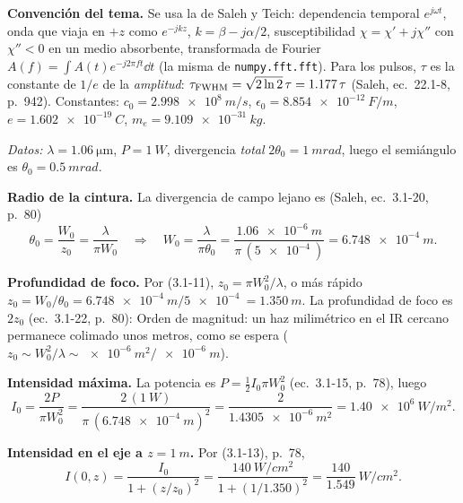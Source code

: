 
\textbf{Convención del tema.} Se usa la de Saleh y Teich: dependencia temporal $e^{j\omega t}$, onda que
viaja en $+z$ como $e^{-jkz}$, $k=\beta-j\alpha/2$, susceptibilidad $\chi=\chi'+j\chi''$ con
$\chi''<0$ en un medio absorbente, transformada de Fourier $A(f)=\int A(t)e^{-j2\pi ft}\dd t$
(la misma de \texttt{numpy.fft.fft}). Para los pulsos, $\tau$ es la constante de $1/e$ de la
\emph{amplitud}: $\tau_{\rm FWHM}=\sqrt{2\ln2}\,\tau=1.177\,\tau$ (Saleh, ec.~22.1-8, p.~942).
Constantes: $c_0=\SI{2.998e8}{m/s}$, $\epsilon_0=\SI{8.854e-12}{F/m}$, $e=\SI{1.602e-19}{C}$,
$m_e=\SI{9.109e-31}{kg}$.

\label{sol:8}

\emph{Datos:} $\lambda=\SI{1.06}{\um}$, $P=\SI{1}{W}$, divergencia \emph{total} $2\theta_0=\SI{1}{mrad}$,
luego el semiángulo es $\theta_0=\SI{0.5}{mrad}$.

 \textbf{Radio de la cintura.} La divergencia de campo lejano es (Saleh, ec.~3.1-20, p.~80)
\[
\theta_0=\frac{W_0}{z_0}=\frac{\lambda}{\pi W_0}
\quad\Longrightarrow\quad
W_0=\frac{\lambda}{\pi\theta_0}=\frac{\SI{1.06e-6}{m}}{\pi\,(\SI{5e-4}{})}=\SI{6.748e-4}{m}.
\]

 \textbf{Profundidad de foco.} Por (3.1-11), $z_0=\pi W_0^2/\lambda$, o más rápido
$z_0=W_0/\theta_0=\SI{6.748e-4}{m}/\SI{5e-4}{}=\SI{1.350}{m}$. La profundidad de foco es
$2z_0$ (ec.~3.1-22, p.~80):
Orden de magnitud: un haz milimétrico en el IR cercano permanece colimado unos metros, como se espera
($z_0\sim W_0^2/\lambda\sim\SI{e-6}{m^2}/\SI{e-6}{m}$).

 \textbf{Intensidad máxima.} La potencia es $P=\tfrac12I_0\pi W_0^2$ (ec.~3.1-15, p.~78),
luego
\[
I_0=\frac{2P}{\pi W_0^2}=\frac{2\,(\SI{1}{W})}{\pi\,(\SI{6.748e-4}{m})^2}=\frac{2}{\SI{1.4305e-6}{m^2}}
=\SI{1.40e6}{W/m^2}.
\]

 \textbf{Intensidad en el eje a $z=\SI{1}{m}$.} Por (3.1-13), p.~78,
\[
I(0,z)=\frac{I_0}{1+(z/z_0)^2}=\frac{\SI{140}{W/cm^2}}{1+(1/1.350)^2}=\frac{140}{1.549}\ \si{W/cm^2}.
\]

